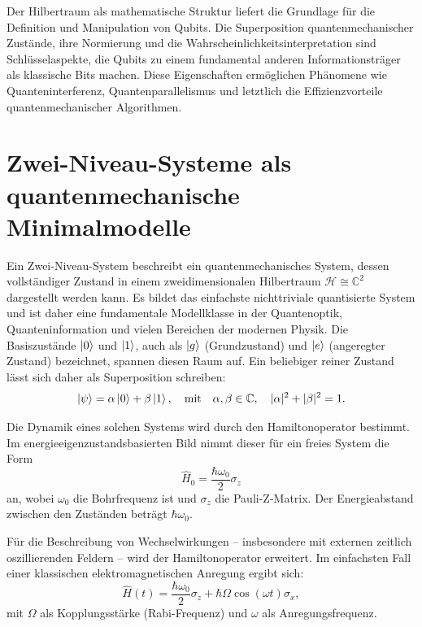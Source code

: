 Der Hilbertraum als mathematische Struktur liefert die Grundlage für die Definition und Manipulation von Qubits. Die Superposition quantenmechanischer Zustände, ihre Normierung und die Wahrscheinlichkeitsinterpretation sind Schlüsselaspekte, die Qubits zu einem fundamental anderen Informationsträger als klassische Bits machen. Diese Eigenschaften ermöglichen Phänomene wie Quanteninterferenz, Quantenparallelismus und letztlich die Effizienzvorteile quantenmechanischer Algorithmen.
\section{Zwei-Niveau-Systeme als quantenmechanische Minimalmodelle}
\label{sec:zwei_niveau}

Ein Zwei-Niveau-System beschreibt ein quantenmechanisches System, dessen vollständiger Zustand in einem zweidimensionalen Hilbertraum $\mathcal{H} \cong \mathbb{C}^2$ dargestellt werden kann. Es bildet das einfachste nichttriviale quantisierte System und ist daher eine fundamentale Modellklasse in der Quantenoptik, Quanteninformation und vielen Bereichen der modernen Physik. Die Basiszustände $\ket{0}$ und $\ket{1}$, auch als $\ket{g}$ (Grundzustand) und $\ket{e}$ (angeregter Zustand) bezeichnet, spannen diesen Raum auf. Ein beliebiger reiner Zustand lässt sich daher als Superposition schreiben:
\begin{equation}
\ket{\psi} = \alpha \ket{0} + \beta \ket{1}, \quad \text{mit} \quad \alpha, \beta \in \mathbb{C}, \quad |\alpha|^2 + |\beta|^2 = 1.
\end{equation}

Die Dynamik eines solchen Systems wird durch den Hamiltonoperator bestimmt. Im energieeigenzustandsbasierten Bild nimmt dieser für ein freies System die Form
\begin{equation}
\hat{H}_0 = \frac{\hbar \omega_0}{2} \sigma_z
\end{equation}
an, wobei $\omega_0$ die Bohrfrequenz ist und $\sigma_z$ die Pauli-Z-Matrix. Der Energieabstand zwischen den Zuständen beträgt $\hbar \omega_0$.

Für die Beschreibung von Wechselwirkungen – insbesondere mit externen zeitlich oszillierenden Feldern – wird der Hamiltonoperator erweitert. Im einfachsten Fall einer klassischen elektromagnetischen Anregung ergibt sich:
\begin{equation}
\hat{H}(t) = \frac{\hbar \omega_0}{2} \sigma_z + \hbar \Omega \cos(\omega t) \sigma_x,
\end{equation}
mit $\Omega$ als Kopplungsstärke (Rabi-Frequenz) und $\omega$ als Anregungsfrequenz. 

